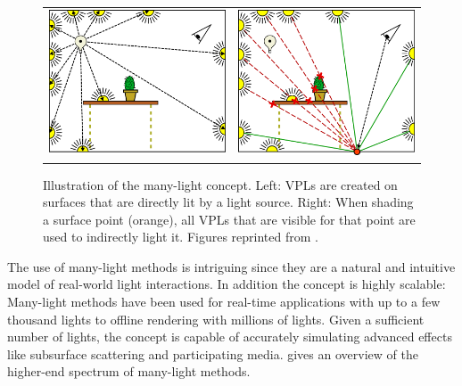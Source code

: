\begin{figure}[htb]
\centering
  \begin{tabular}{@{}cc@{}}
    \includegraphics[width=.48\textwidth]{graphics/many_lights_laine_1} &
    \includegraphics[width=.48\textwidth]{graphics/many_lights_laine_2}\\
  \end{tabular}
  \caption{Illustration of the many-light concept. Left: VPLs are created on surfaces that are directly lit by a light source. Right: When shading a surface point (orange), all VPLs that are visible for that point are used to indirectly light it. Figures reprinted from \citet{laine2007incremental}.}
  \label{fig:intro:many_lights_visualization}
\end{figure}

The use of many-light methods is intriguing since they are a natural and intuitive model of real-world light interactions. In addition the concept is highly scalable: Many-light methods have been used for real-time applications with up to a few thousand lights to offline rendering with millions of lights. Given a sufficient number of lights, the concept is capable of accurately simulating advanced effects like subsurface scattering and participating media. \citet{Dachsbacher:2014:ManyLightsSTAR} gives an overview of the higher-end spectrum of many-light methods.

